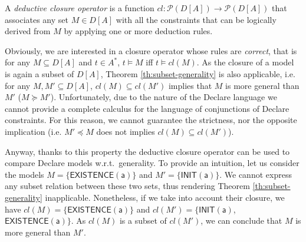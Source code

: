 \theoremstyle{definition}\label{def:closure}
\begin{definition}{}
A \emph{deductive closure operator} is a function $cl: \mathcal{P}(D[A])\rightarrow\mathcal{P}(D[A])$ that associates any set $M \in D[A]$ with all the constraints that can be logically derived from $M$ by applying one or more deduction rules.
\end{definition} 

Obviously, we are interested in a closure operator whose rules are \emph{correct}, that is for any $M\subseteq D[A]$ and $t\in A^*$, $t\models M$ iff $t\models cl(M)$.
As the closure of a model is again a subset of $D[A]$, Theorem \ref{th:subset-generality} is also applicable, i.e. for any $M, M'\subseteq D[A]$, $cl(M)\subseteq cl(M')$ implies that $M$ is more general than $M'$ ($M\succeq M'$).
%
%
Unfortunately, due to the nature of the Declare language we cannot provide a complete calculus for the language of conjunctions of Declare constraints. For this reason, we cannot guarantee the strictness, nor the opposite implication (i.e. $M'\preceq M$ does not implies $cl(M)\subseteq cl(M')$).

Anyway, thanks to this property the deductive closure operator can be used to compare Declare models w.r.t.~generality. To provide an intuition, let us consider the models $M= \{\mathsf{EXISTENCE(a)}\}$ and $M' = \{\mathsf{INIT(a)}\}$. We cannot express any subset relation between these two sets, thus rendering Theorem \ref{th:subset-generality} inapplicable. Nonetheless, if we take into account their closure, we have $cl(M)=\{\mathsf{EXISTENCE(a)}\}$ and $cl(M')=\{\mathsf{INIT(a)}$, $\mathsf{EXISTENCE(a)}\}$. As $cl(M)$ is a subset of $cl(M')$, we can conclude that $M$ is more general than $M'$.



